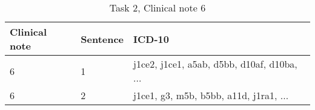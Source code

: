 \begin{table}[!htb] \footnotesize \center
\caption{Task 2, Clinical note 6 \label{tab:t2c6}}
\begin{tabularx}{\textwidth}{l l X}
    \toprule
    Clinical note & Sentence & ICD-10 \\
    \midrule
	 6 & 1 & j1ce2, j1ce1, a5ab, d5bb, d10af, d10ba, ... \\
	 6 & 2 & j1ce1, g3, m5b, b5bb, a11d, j1ra1, ... \\
	\bottomrule
\end{tabularx}
\end{table}